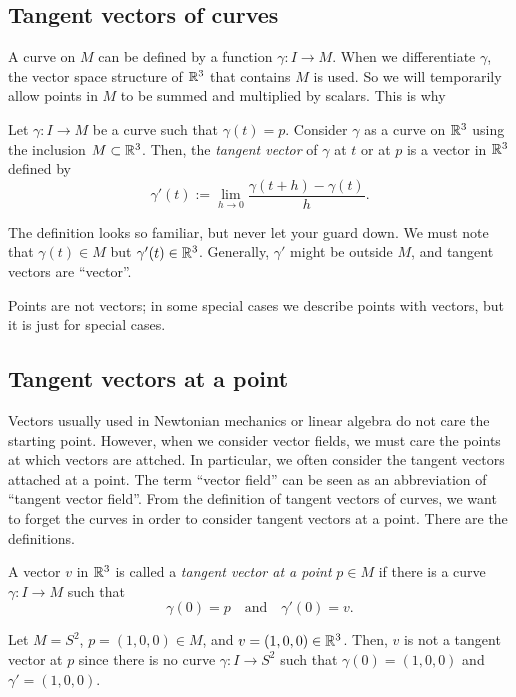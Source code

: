 \documentclass{../exp}
\begin{document}
\subsection{Tangent vectors of curves}
A curve on $M$ can be defined by a function $\gamma:I\to M$.
When we differentiate $\gamma$, the vector space structure of $\mathbb{R}^3$ that contains $M$ is used.
So we will temporarily allow points in $M$ to be summed and multiplied by scalars.
This is why 
\begin{defn}
Let $\gamma:I\to M$ be a curve such that $\gamma(t)=p$.
Consider $\gamma$ as a curve on $\mathbb{R}^3$ using the inclusion $M\subset\mathbb{R}^3$.
Then, the \emph{tangent vector} of $\gamma$ at $t$ or at $p$ is a vector in $\mathbb{R}^3$ defined by
\[\gamma'(t):=\lim_{h\to0}\frac{\gamma(t+h)-\gamma(t)}{h}.\]
\end{defn}
The definition looks so familiar, but never let your guard down.
We must note that $\gamma(t)\in M$ but $\gamma'(t)\in\mathbb{R}^3$.
Generally, $\gamma'$ might be outside $M$, and tangent vectors are ``vector''.

Points are not vectors; in some special cases we describe points with vectors, but it is just for special cases.


\subsection{Tangent vectors at a point}

Vectors usually used in Newtonian mechanics or linear algebra do not care the starting point.
However, when we consider vector fields, we must care the points at which vectors are attched.
In particular, we often consider the tangent vectors attached at a point.
The term ``vector field'' can be seen as an abbreviation of ``tangent vector field''.
From the definition of tangent vectors of curves, we want to forget the curves in order to consider tangent vectors at a point.
There are the definitions.

\begin{defn}
A vector $v$ in $\mathbb{R}^3$ is called a \emph{tangent vector at a point} $p\in M$ if there is a curve $\gamma:I\to M$ such that
\[\gamma(0)=p\quad\text{and}\quad\gamma'(0)=v.\]
\end{defn}

\begin{ex}
Let $M=S^2$, $p=(1,0,0)\in M$, and $v=(1,0,0)\in\mathbb{R}^3$.
Then, $v$ is not a tangent vector at $p$ since there is no curve $\gamma:I\to S^2$ such that $\gamma(0)=(1,0,0)$ and $\gamma'=(1,0,0)$.
\end{ex}
\end{document}
